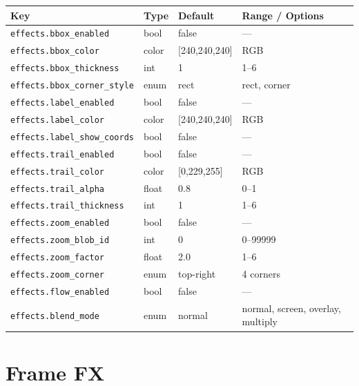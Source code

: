 \documentclass[11pt,a4paper,openany]{report}
\begin{document}
\begin{longtable}{@{}llll@{}}
    \toprule
    \textbf{Key} & \textbf{Type} & \textbf{Default} & \textbf{Range / Options} \\
    \midrule
    \endhead
    \texttt{effects.bbox\_enabled}        & bool  & false              & --- \\
    \texttt{effects.bbox\_color}          & color & [240,240,240]      & RGB \\
    \texttt{effects.bbox\_thickness}      & int   & 1                  & 1--6 \\
    \texttt{effects.bbox\_corner\_style}  & enum  & rect               & rect, corner \\
    \texttt{effects.label\_enabled}       & bool  & false              & --- \\
    \texttt{effects.label\_color}         & color & [240,240,240]      & RGB \\
    \texttt{effects.label\_show\_coords}  & bool  & false              & --- \\
    \texttt{effects.trail\_enabled}       & bool  & false              & --- \\
    \texttt{effects.trail\_color}         & color & [0,229,255]        & RGB \\
    \texttt{effects.trail\_alpha}         & float & 0.8                & 0--1 \\
    \texttt{effects.trail\_thickness}     & int   & 1                  & 1--6 \\
    \texttt{effects.zoom\_enabled}        & bool  & false              & --- \\
    \texttt{effects.zoom\_blob\_id}       & int   & 0                  & 0--99999 \\
    \texttt{effects.zoom\_factor}         & float & 2.0                & 1--6 \\
    \texttt{effects.zoom\_corner}         & enum  & top-right          & 4 corners \\
    \texttt{effects.flow\_enabled}        & bool  & false              & --- \\
    \texttt{effects.blend\_mode}          & enum  & normal             & normal, screen, overlay, multiply \\
    \bottomrule
\end{longtable}

\section{Frame FX}
\end{document}
